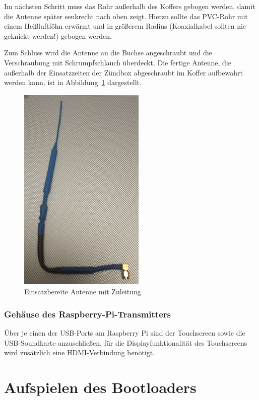 \documentclass[paper=a4, parskip, numbers=noenddot, toc=listof, headsepline]{scrbook}
\begin{document}
					Im nächsten Schritt muss das Rohr außerhalb des Koffers gebogen werden, damit die Antenne später senkrecht nach oben zeigt. Hierzu sollte das PVC-Rohr mit einem Heißluftföhn erwärmt und in größerem Radius (Koaxialkabel sollten nie geknickt werden!) gebogen werden.

					Zum Schluss wird die Antenne an die Buchse angeschraubt und die Verschraubung mit Schrumpfschlauch überdeckt. Die fertige Antenne, die außerhalb der Einsatzzeiten der Zündbox abgeschraubt im Koffer aufbewahrt werden kann, ist in Abbildung~\ref{fig:antennefertig} dargestellt.

					\begin{figure}
						\centering
						\includegraphics[width=6cm, height=10cm]{Bilder/antennefertig}
						\caption{Einsatzbereite Antenne mit Zuleitung}
						\label{fig:antennefertig}
					\end{figure}

			\subsection{Gehäuse des Raspberry-Pi-Transmitters}
				\label{subsec:raspicase}

				Über je einen der USB-Ports am Raspberry Pi sind der Touchscreen sowie die USB-Soundkarte anzuschließen, für die Displayfunktionalität des Touchscreens wird zusätzlich eine HDMI-Verbindung benötigt.

	\chapter{Aufspielen des Bootloaders}
		\label{ch:bootloader}
\end{document}

